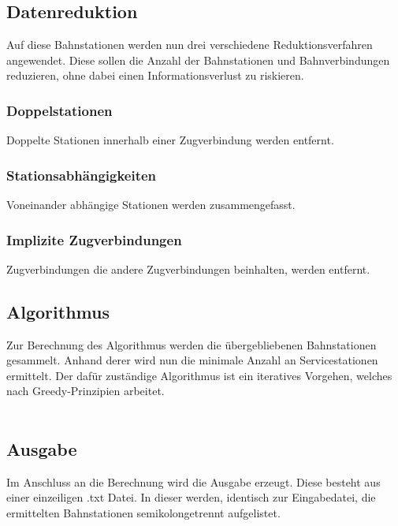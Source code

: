 \subsection{Datenreduktion}\label{auf:subsubsec:datenreduktion}
Auf diese Bahnstationen werden nun drei verschiedene Reduktionsverfahren angewendet. Diese sollen die Anzahl der Bahnstationen und Bahnverbindungen reduzieren, ohne dabei einen Informationsverlust zu riskieren.\\ 

\subsubsection{Doppelstationen}\label{auf:subsubsec:doppelstationen}
Doppelte Stationen innerhalb einer Zugverbindung werden entfernt.

\subsubsection{Stationsabhängigkeiten}\label{auf:subsubsec:stationsabhaengigkeiten}
Voneinander abhängige Stationen werden zusammengefasst.

\subsubsection{Implizite Zugverbindungen}\label{auf:subsubsec:implizite-zugverbindungen}
Zugverbindungen die andere Zugverbindungen beinhalten, werden entfernt.
\\
\subsection{Algorithmus}\label{auf:subsec:algorithmus}
Zur Berechnung des Algorithmus werden die übergebliebenen Bahnstationen gesammelt. Anhand derer wird nun die minimale Anzahl an Servicestationen ermittelt. Der dafür zuständige Algorithmus ist ein iteratives Vorgehen, welches nach Greedy-Prinzipien arbeitet.\\
\\
\subsection{Ausgabe}\label{auf:subsec:ausgabe}
Im Anschluss an die Berechnung wird die Ausgabe erzeugt. Diese besteht aus einer einzeiligen .txt Datei. In dieser werden, identisch zur Eingabedatei, die ermittelten Bahnstationen semikolongetrennt aufgelistet.\\

